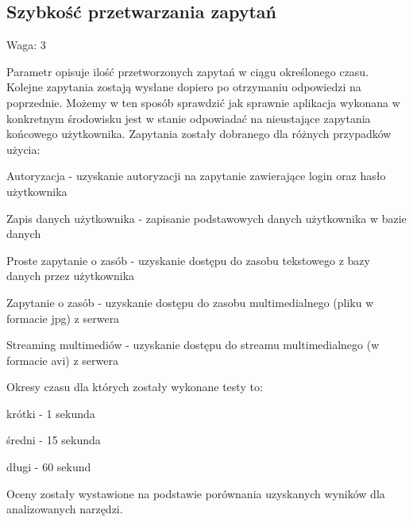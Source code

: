 \documentclass[12pt]{report}
\begin{document}
    \subsection{Szybkość przetwarzania zapytań}
      \begin{description}
        \item Waga: 3
      \end{description}
      Parametr opisuje ilość przetworzonych zapytań w ciągu określonego czasu.
      Kolejne zapytania zostają wysłane dopiero po otrzymaniu odpowiedzi na poprzednie.
      Możemy w ten sposób sprawdzić jak sprawnie aplikacja wykonana w konkretnym środowisku jest w stanie odpowiadać na nieustające zapytania końcowego użytkownika.
      Zapytania zostały dobranego dla różnych przypadków użycia:
      \begin{description}
        \item Autoryzacja - uzyskanie autoryzacji na zapytanie zawierające login oraz hasło użytkownika
        \item Zapis danych użytkownika - zapisanie podstawowych danych użytkownika w bazie danych
        \item Proste zapytanie o zasób - uzyskanie dostępu do zasobu tekstowego z bazy danych przez użytkownika
        \item Zapytanie o zasób - uzyskanie dostępu do zasobu multimedialnego (pliku w formacie jpg) z serwera
        \item Streaming multimediów - uzyskanie dostępu do streamu multimedialnego (w formacie avi) z serwera
      \end{description}
      Okresy czasu dla których zostały wykonane testy to:
      \begin{description}
        \item krótki - 1 sekunda
        \item średni - 15 sekunda
        \item długi - 60 sekund
      \end{description}
      Oceny zostały wystawione na podstawie porównania uzyskanych wyników dla analizowanych narzędzi.
      
\end{document}
